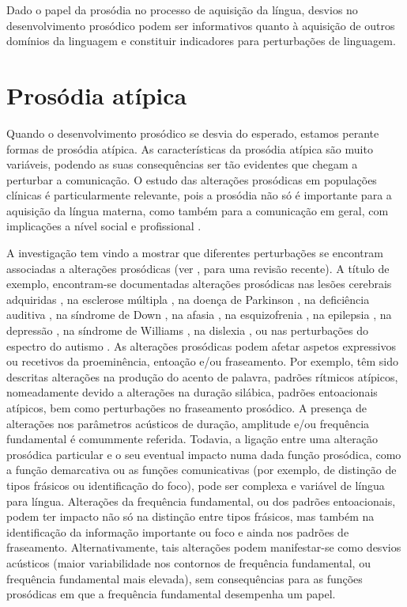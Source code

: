\documentclass[output=paper,colorlinks,citecolor=brown,booklanguage=portuguese]{langscibook}
\begin{document}
Dado o papel da prosódia no processo de aquisição da língua, desvios no desenvolvimento prosódico podem ser informativos quanto à aquisição de outros domínios da linguagem e constituir indicadores para perturbações de linguagem.

\section{Prosódia atípica}\label{sec:cap8sec2}
Quando o desenvolvimento prosódico se desvia do esperado, estamos perante formas de prosódia atípica. As características da prosódia atípica são muito variáveis, podendo as suas consequências ser tão evidentes que chegam a perturbar a comunicação. O estudo das alterações prosódicas em populações clínicas é particularmente relevante, pois a prosódia não só é importante para a aquisição da língua materna, como também para a comunicação em geral, com implicações a nível social e profissional \citep{Paul2005}.

A investigação tem vindo a mostrar que diferentes perturbações se encontram associadas a alterações prosódicas (ver \citealp{Peppe2018}, para uma revisão recente). A título de exemplo, encontram-se documentadas alterações prosódicas nas lesões cerebrais adquiridas \citep{Adamaszek2013}, na esclerose múltipla \citep{Bunton2000}, na doença de Parkinson \citep{Penner2008, Frota2021}, na deficiência auditiva \citep{Parker1990}, na síndrome de Down \citep{Heselwood1995}, na afasia \citep{Seddoh2004}, na esquizofrenia \citep{Pascual2005}, na epilepsia \citep{SanzMartin2006}, na depressão \citep{Alpert2001}, na síndrome de Williams \citep{Catterall2006}, na dislexia \citep{Goswami2010}, ou nas perturbações do espectro do autismo \citep{Baltaxe1985}. As alterações prosódicas podem afetar aspetos expressivos ou recetivos da proeminência, entoação e/ou fraseamento. Por exemplo, têm sido descritas alterações na produção do acento de palavra, padrões rítmicos atípicos, nomeadamente devido a alterações na duração silábica, padrões entoacionais atípicos, bem como perturbações no fraseamento prosódico. A presença de alterações nos parâmetros acústicos de duração, amplitude e/ou frequência fundamental é comummente referida. Todavia, a ligação entre uma alteração prosódica particular e o seu eventual impacto numa dada função prosódica, como a função demarcativa ou as funções comunicativas (por exemplo, de distinção de tipos frásicos ou identificação do foco), pode ser complexa e variável de língua para língua. Alterações da frequência fundamental, ou dos padrões entoacionais, podem ter impacto não só na distinção entre tipos frásicos, mas também na identificação da informação importante ou foco e ainda nos padrões de fraseamento. Alternativamente, tais alterações podem manifestar-se como desvios acústicos (maior variabilidade nos contornos de frequência fundamental, ou frequência fundamental mais elevada), sem consequências para as funções prosódicas em que a frequência fundamental desempenha um papel.
\end{document}
